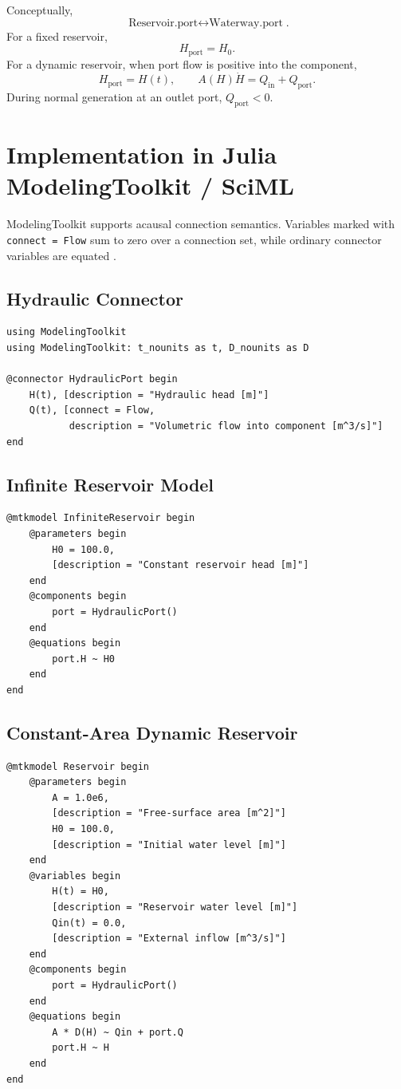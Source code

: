 \documentclass[11pt,a4paper]{article}
\begin{document}
Conceptually,
\[
\boxed{\text{Reservoir.port}\longleftrightarrow\text{Waterway.port}}.
\]
For a fixed reservoir,
\[
H_{\mathrm{port}}=H_0.
\]
For a dynamic reservoir, when port flow is positive into the component,
\[
H_{\mathrm{port}}=H(t),\qquad A(H)\dot H=Q_{\mathrm{in}}+Q_{\mathrm{port}}.
\]
During normal generation at an outlet port, $Q_{\mathrm{port}}<0$.

\section{Implementation in Julia ModelingToolkit / SciML}
ModelingToolkit supports acausal connection semantics. Variables marked with \texttt{connect = Flow} sum to zero over a connection set, while ordinary connector variables are equated \cite{MTKConnect}.

\subsection{Hydraulic Connector}
\begin{lstlisting}
using ModelingToolkit
using ModelingToolkit: t_nounits as t, D_nounits as D

@connector HydraulicPort begin
    H(t), [description = "Hydraulic head [m]"]
    Q(t), [connect = Flow,
           description = "Volumetric flow into component [m^3/s]"]
end
\end{lstlisting}

\subsection{Infinite Reservoir Model}
\begin{lstlisting}
@mtkmodel InfiniteReservoir begin
    @parameters begin
        H0 = 100.0,
        [description = "Constant reservoir head [m]"]
    end
    @components begin
        port = HydraulicPort()
    end
    @equations begin
        port.H ~ H0
    end
end
\end{lstlisting}

\subsection{Constant-Area Dynamic Reservoir}
\begin{lstlisting}
@mtkmodel Reservoir begin
    @parameters begin
        A = 1.0e6,
        [description = "Free-surface area [m^2]"]
        H0 = 100.0,
        [description = "Initial water level [m]"]
    end
    @variables begin
        H(t) = H0,
        [description = "Reservoir water level [m]"]
        Qin(t) = 0.0,
        [description = "External inflow [m^3/s]"]
    end
    @components begin
        port = HydraulicPort()
    end
    @equations begin
        A * D(H) ~ Qin + port.Q
        port.H ~ H
    end
end
\end{lstlisting}
\end{document}
